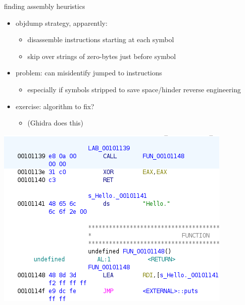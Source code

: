 \begin{frame}{finding assembly heuristics}
    \begin{itemize}
    \item objdump strategy, apparently:
        \begin{itemize}
        \item disassemble instructions starting at each symbol
        \item skip over strings of zero-bytes just before symbol
        \end{itemize}
    \item problem: can misidentify jumped to instructions
        \begin{itemize}
        \item especially if symbols stripped to save space/hinder reverse engineering
        \end{itemize}
    \item exercise: algorithm to fix?
        \begin{itemize}
        \item (Ghidra does this)
        \end{itemize}
    \end{itemize}
\end{frame}



\begin{frame}
\includegraphics[width=\textwidth]{ghidra-disass-mixed-detail}
\end{frame}
